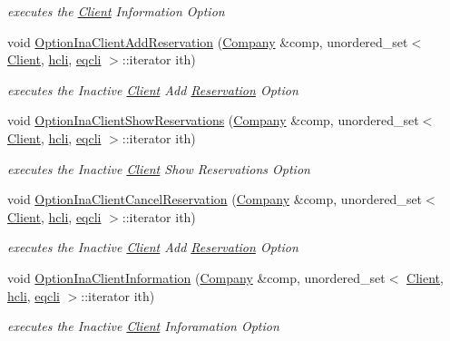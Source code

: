 \begin{DoxyCompactItemize}
\begin{DoxyCompactList}\small\item\em executes the \hyperlink{class_client}{Client} Information Option \end{DoxyCompactList}\item 
void \hyperlink{class_menu_ac87954509d932e68db4b881be7cf4720}{Option\+Ina\+Client\+Add\+Reservation} (\hyperlink{class_company}{Company} \&comp, unordered\+\_\+set$<$ \hyperlink{class_client}{Client}, \hyperlink{structhcli}{hcli}, \hyperlink{structeqcli}{eqcli} $>$\+::iterator ith)
\begin{DoxyCompactList}\small\item\em executes the Inactive \hyperlink{class_client}{Client} Add \hyperlink{class_reservation}{Reservation} Option \end{DoxyCompactList}\item 
void \hyperlink{class_menu_afb3ef4ef2b6681ad50b1fcbb8893dc06}{Option\+Ina\+Client\+Show\+Reservations} (\hyperlink{class_company}{Company} \&comp, unordered\+\_\+set$<$ \hyperlink{class_client}{Client}, \hyperlink{structhcli}{hcli}, \hyperlink{structeqcli}{eqcli} $>$\+::iterator ith)
\begin{DoxyCompactList}\small\item\em executes the Inactive \hyperlink{class_client}{Client} Show Reservations Option \end{DoxyCompactList}\item 
void \hyperlink{class_menu_a9926ac704596d4b58f9e052eb2b972c7}{Option\+Ina\+Client\+Cancel\+Reservation} (\hyperlink{class_company}{Company} \&comp, unordered\+\_\+set$<$ \hyperlink{class_client}{Client}, \hyperlink{structhcli}{hcli}, \hyperlink{structeqcli}{eqcli} $>$\+::iterator ith)
\begin{DoxyCompactList}\small\item\em executes the Inactive \hyperlink{class_client}{Client} Add \hyperlink{class_reservation}{Reservation} Option \end{DoxyCompactList}\item 
void \hyperlink{class_menu_a00dee88baecc198ca488a394e7c1d8b7}{Option\+Ina\+Client\+Information} (\hyperlink{class_company}{Company} \&comp, unordered\+\_\+set$<$ \hyperlink{class_client}{Client}, \hyperlink{structhcli}{hcli}, \hyperlink{structeqcli}{eqcli} $>$\+::iterator ith)
\begin{DoxyCompactList}\small\item\em executes the Inactive \hyperlink{class_client}{Client} Inforamation Option \end{DoxyCompactList}\item 

\end{DoxyCompactItemize}
